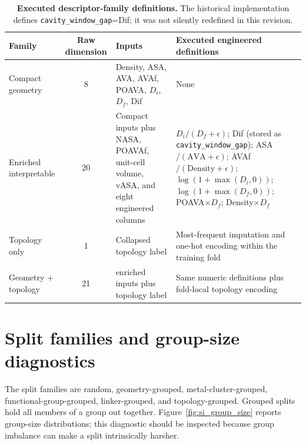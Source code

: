 \documentclass[11pt,a4paper]{article}
\begin{document}
\begin{table}[H]
\centering
\scriptsize
\caption{\textbf{Executed descriptor-family definitions.} The historical implementation defines \texttt{cavity\_window\_gap}=Dif; it was not silently redefined in this revision.}
\label{tab:descriptor_definitions}
\begin{tabularx}{\textwidth}{>{\raggedright\arraybackslash}p{}c>{\raggedright\arraybackslash}p{}>{\raggedright\arraybackslash}X}
\toprule
Family & Raw dimension & Inputs & Executed engineered definitions \\
\midrule
Compact geometry & 8 & Density, ASA, AVA, AVAf, POAVA, $D_i$, $D_f$, Dif & None \\
Enriched interpretable & 20 & Compact inputs plus NASA, POAVAf, unit-cell volume, vASA, and eight engineered columns & $D_i/(D_f+\epsilon)$; Dif (stored as \texttt{cavity\_window\_gap}); ASA$/(\mathrm{AVA}+\epsilon)$; AVAf$/(\mathrm{Density}+\epsilon)$; $\log(1+\max(D_i,0))$; $\log(1+\max(D_f,0))$; POAVA$\times D_f$; Density$\times D_f$ \\
Topology only & 1 & Collapsed topology label & Most-frequent imputation and one-hot encoding within the training fold \\
Geometry + topology & 21 & 20 enriched inputs plus topology label & Same numeric definitions plus fold-local topology encoding \\
\bottomrule
\end{tabularx}
\end{table}

\section{Split families and group-size diagnostics}
The split families are random, geometry-grouped, metal-cluster-grouped, functional-group-grouped, linker-grouped, and topology-grouped. Grouped splits hold all members of a group out together.  Figure~\ref{fig:si_group_size} reports group-size distributions; this diagnostic should be inspected because group imbalance can make a split intrinsically harsher.
\end{document}
